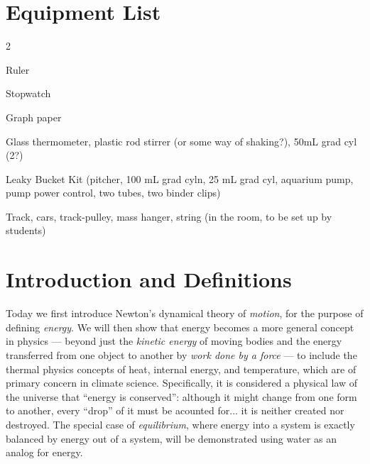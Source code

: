 




\section*{Equipment List}

\begin{multicols}{2}   %
\begin{equipment}
  \item Ruler
  \item Stopwatch
  \item Graph paper
  \item Glass thermometer, plastic rod stirrer  (or some way of shaking?), 50mL grad cyl (2?) 
  \item Leaky Bucket Kit (pitcher, 100 mL grad cyln, 25 mL grad cyl, aquarium pump, pump  power control, two tubes, two binder clips)
  \item Track, cars, track-pulley, mass hanger, string (in the room, to be set up by students)
\end{equipment}
\end{multicols}


\section{Introduction and Definitions}

Today we first introduce Newton's dynamical theory of {\em motion}, for the purpose of defining {\em energy}.  We will then show that energy becomes a more general concept in physics --- beyond just the {\em kinetic energy} of moving bodies and the energy transferred from one object to another by {\em work done by a force} --- to include the thermal physics concepts of heat, internal energy, and temperature, which are of primary concern in climate science.  Specifically, it is considered a physical law of the universe that ``energy is conserved'': although it might change from one form to another, every ``drop'' of it must be acounted for... it is neither created nor destroyed.  The special case of {\em equilibrium}, where energy into a system is exactly balanced by energy out of a system, will be demonstrated using water as an analog for energy.\\[-6pt]

